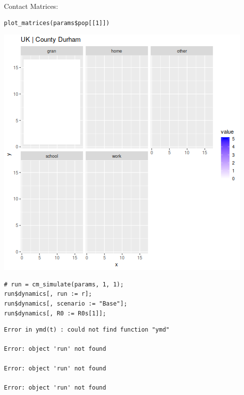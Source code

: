 \documentclass[11pt]{article}
\begin{document}
Contact Matrices:
\begin{verbatim}
plot_matrices(params$pop[[1]])
\end{verbatim}

\begin{center}
\includegraphics[width=.9\linewidth]{1-intervention-all.png}
\end{center}

\begin{verbatim}
# run = cm_simulate(params, 1, 1);
run$dynamics[, run := r];
run$dynamics[, scenario := "Base"];
run$dynamics[, R0 := R0s[1]];
\end{verbatim}

\begin{verbatim}
Error in ymd(t) : could not find function "ymd"

Error: object 'run' not found

Error: object 'run' not found

Error: object 'run' not found
\end{verbatim}
\end{document}

